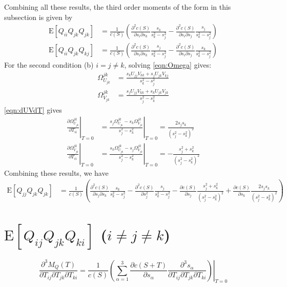 \documentclass[10pt]{article}
\newcommand{\expect}[1]{\ensuremath{\mathrm{E}\left[ #1 \right]}}
\begin{document}
Combining all these results, the third order moments of the form in this subsection is given by
\begin{align}
	\expect{Q_{ii}Q_{jk}Q_{jk}} &= \frac{1}{c(S)} \left( \frac{\partial^2 c(S)}{\partial s_i \partial s_k} \frac{s_k}{s_k^2-s_j^2} - \frac{\partial^2 c(S)}{\partial s_i \partial s_j} \frac{s_j}{s_k^2-s_j^2} \right) \nonumber \\
	\expect{Q_{ii}Q_{jk}Q_{kj}} &= \frac{1}{c(S)} \left( \frac{\partial^2 c(S)}{\partial s_i \partial s_k} \frac{s_j}{s_k^2-s_j^2} - \frac{\partial^2 c(S)}{\partial s_i \partial s_j} \frac{s_k}{s_k^2-s_j^2} \right)
\end{align}
For the second condition (b) $i=j\neq k$, solving \eqref{eqn:Omega} gives:
\begin{align}
	\Omega_{U_{jk}}^{jk} &= \frac{s_kU_{jj}V_{kk}+s_jU_{jk}V_{kj}}{s_k^2-s_j^2} \nonumber \\
	\Omega_{V_{jk}}^{jk} &= \frac{s_jU_{jj}V_{kk}+s_kU_{jk}V_{jk}}{s_j^2-s_k^2}
\end{align}
\eqref{eqn:dUVdT} gives
\begin{align}
	\left.\frac{\partial \Omega_{U_{jk}}^{jk}}{\partial T_{ii}}\right|_{T=0} &= \left.\frac{s_j\Omega_{U_{jk}}^{jk} - s_k\Omega_{V_{jk}}^{jk}}{s_j^2-s_k^2}\right|_{T=0} = \frac{2s_js_k}{(s_j^2-s_k^2)^2} \nonumber \\
	\left.\frac{\partial \Omega_{V_{jk}}^{jk}}{\partial T_{ii}}\right|_{T=0} &= \left.\frac{s_k\Omega_{U_{jk}}^{jk} - s_j\Omega_{V_{jk}}^{jk}}{s_j^2-s_k^2}\right|_{T=0} = -\frac{s_j^2+s_k^2}{(s_j^2-s_k^2)^2}
\end{align}
Combining these results, we have
\begin{align}
	\expect{Q_{jj}Q_{jk}Q_{jk}} &= \frac{1}{c(S)} \left( \frac{\partial^2 c(S)}{\partial s_j \partial s_k} \frac{s_k}{s_k^2-s_j^2} - \frac{\partial^2 c(S)}{\partial s_j^2} \frac{s_j}{s_k^2-s_j^2} - \frac{\partial c(S)}{\partial s_j} \frac{s_j^2+s_k^2}{(s_j^2-s_k^2)^2} + \frac{\partial c(S)}{\partial s_k} \frac{2s_js_k}{(s_j^2-s_k^2)^2} \right)
\end{align}

\section{$\expect{Q_{ij}Q_{jk}Q_{ki}}$ ($i\neq j\neq k$)}
\begin{equation*}
	\frac{\partial^3 M_Q(T)}{\partial T_{ij} \partial T_{jk} \partial T_{ki}} = \frac{1}{c(S)}\left.\left( \sum_{\alpha=1}^3 \frac{\partial c(S+T)}{\partial s_\alpha} \frac{\partial^3 s_\alpha}{\partial T_{ij} \partial T_{jk} \partial T_{ki}} \right)\right|_{T=0}
\end{equation*}
\end{document}
